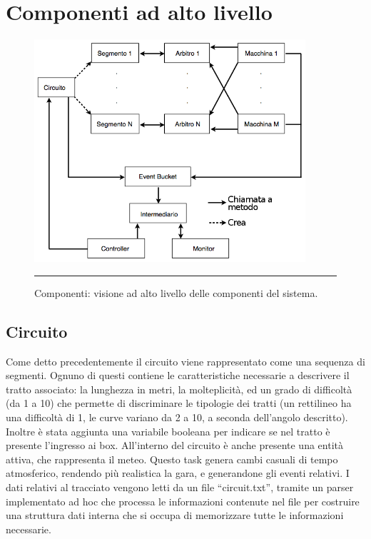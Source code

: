 \section{Componenti ad alto livello}

\begin{figure}[htbp]
	\centering
		\includegraphics[keepaspectratio = true, width = 380px] {Pictures/schema}
		\rule{35em}{0.5pt}
	\caption[Componenti]{Componenti: visione ad alto livello delle componenti del sistema.}
	\label{fig:Componenti}
\end{figure}

\subsection{Circuito}

Come detto precedentemente il circuito viene rappresentato come una sequenza di segmenti. Ognuno di questi contiene le caratteristiche necessarie a descrivere il tratto associato: la lunghezza in metri, la molteplicità, ed un grado di difficoltà (da 1 a 10) che permette di discriminare le tipologie dei tratti (un rettilineo ha una difficoltà di 1, le curve variano da 2 a 10, a seconda dell’angolo descritto). Inoltre è stata aggiunta una variabile booleana per indicare se nel tratto è presente l’ingresso ai box.
All’interno del circuito è anche presente una entità attiva, che rappresenta il meteo. Questo task genera cambi casuali di tempo atmosferico, rendendo più realistica la gara, e generandone gli eventi relativi.
I dati relativi al tracciato vengono letti da un file “circuit.txt”, tramite un parser implementato ad hoc che processa le informazioni contenute nel file per costruire una struttura dati interna che si occupa di memorizzare tutte le informazioni necessarie.


